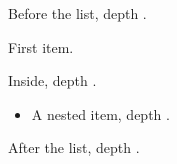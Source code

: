 \documentclass{article}
\begin{document}
\makeatletter
Before the list, depth \the\@listdepth.\par
\begingroup\list{}{\advance\@listdepth\m@ne}
\item First item.

Inside, depth \the\@listdepth.
\begin{itemize}
\item A nested item, depth \the\@listdepth.
\end{itemize}

\endlist\endgroup
After the list, depth \the\@listdepth.
\makeatother
\end{document}
